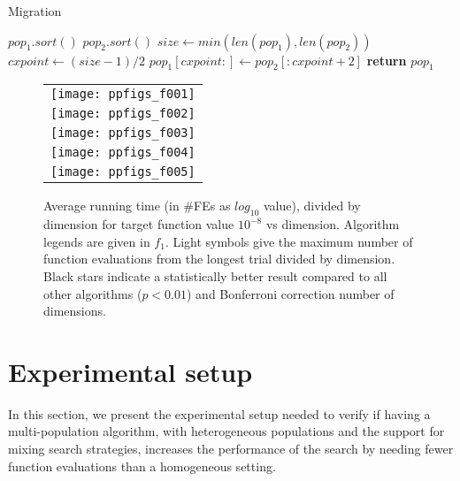 \begin{algorithm}
    \caption{Migration}
    \label{alg:migration}
    \begin{algorithmic}[1]
            \State $pop_1.sort()$
            \State $pop_2.sort()$
            \State $size\gets min(len(pop_1), len(pop_2))$
            \State $cxpoint\gets (size-1)/2$
            \State $pop_1[cxpoint:]\gets pop_2[:cxpoint+2]$
            \State \textbf{return} $pop_1$
        \EndProcedure 
    \end{algorithmic}
\end{algorithm}
%
\begin{figure}
  \begin{tabular}
      {c@{\hspace*{-0.00001\textwidth}}
      }
     
  \texttt{[image: ppfigs\_f001]}\\
  \texttt{[image: ppfigs\_f002]}\\

  \texttt{[image: ppfigs\_f003]}\\
  \texttt{[image: ppfigs\_f004]}\\
  
  \texttt{[image: ppfigs\_f005]}\\
  \end{tabular}
  \vspace{-3ex}
   \caption{Average running time (in \#FEs as $log_{10}$ value),
    divided by dimension for target function value $10^{-8}$ vs dimension. 
    Algorithm legends are given in $f_1$. Light symbols give the maximum number of 
    function evaluations from the longest trial divided by dimension. 
    Black stars indicate a statistically better result compared to 
    all other algorithms ($p < 0.01$) and Bonferroni 
    correction number of dimensions.}
  \label{fig:avg}
\end{figure}
%
\section{Experimental setup}
\label{setup}

In this section, we present the experimental setup needed 
to verify if having a multi-population algorithm, with
heterogeneous populations and the support for mixing search strategies,
increases the performance of the search by needing fewer function evaluations
than a homogeneous setting.

